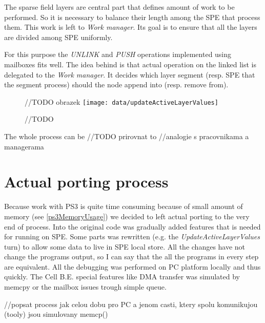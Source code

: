 The sparse field layers are central part that defines amount of work to be performed.
So it is necessary to balance their length among the SPE that process them.
This work is left to \emph{Work manager}.
Its goal is to ensure that all the layers are divided among SPE uniformly.

For this purpose the \emph{UNLINK} and \emph{PUSH} operations implemented using mailboxes fits well.
The idea behind is that actual operation on the linked list is delegated to the \emph{Work manager}.
It decides which layer segment (resp. SPE that the segment process) should the node append into (resp. remove from).

\begin{figure}	//TODO obrazek
    \centering
    \texttt{[image: data/updateActiveLayerValues]}
    \caption[Diagram of new design components]{//TODO}
    \label{fg:updateActiveLayerValues}
\end{figure}

The whole process can be //TODO prirovnat to
//analogie s pracovnikama a managerama

\section{Actual porting process}

Because work with PS3 is quite time consuming because of small amount of memory (see \ref{ps3MemoryUsage}) we decided to left actual porting to the very end of process.
Into the original code was gradually added features that is needed for running on SPE.
Some parts was rewritten (e.g. the \emph{UpdateActiveLayerValues} turn) to allow some data to live in SPE local store.
All the changes have not change the programs output, so I can say that the all the programs in every step are equivalent.
All the debugging was performed on PC platform locally and thus quickly.
The Cell B.E. special features like DMA transfer was simulated by memcpy or the mailbox issues trough simple queue.



//popsat process jak celou dobu pro PC a jenom casti, ktery spolu komunikujou (tooly) jsou simulovany memcp()